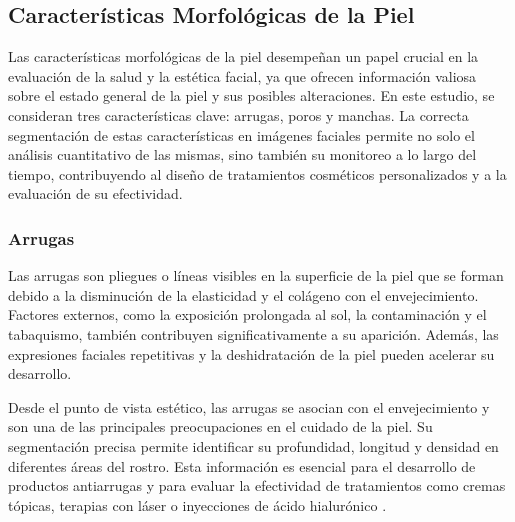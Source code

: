 
\subsection{Características Morfológicas de la Piel}
Las características morfológicas de la piel desempeñan un papel crucial en la evaluación de la salud y la estética facial, ya que ofrecen información valiosa sobre el estado general de la piel y sus posibles alteraciones. En este estudio, se consideran tres características clave: arrugas, poros y manchas. La correcta segmentación de estas características en imágenes faciales permite no solo el análisis cuantitativo de las mismas, sino también su monitoreo a lo largo del tiempo, contribuyendo al diseño de tratamientos cosméticos personalizados y a la evaluación de su efectividad.

\subsubsection{Arrugas}
Las arrugas son pliegues o líneas visibles en la superficie de la piel que se forman debido a la disminución de la elasticidad y el colágeno con el envejecimiento. Factores externos, como la exposición prolongada al sol, la contaminación y el tabaquismo, también contribuyen significativamente a su aparición. Además, las expresiones faciales repetitivas y la deshidratación de la piel pueden acelerar su desarrollo.

Desde el punto de vista estético, las arrugas se asocian con el envejecimiento y son una de las principales preocupaciones en el cuidado de la piel. Su segmentación precisa permite identificar su profundidad, longitud y densidad en diferentes áreas del rostro. Esta información es esencial para el desarrollo de productos antiarrugas y para evaluar la efectividad de tratamientos como cremas tópicas, terapias con láser o inyecciones de ácido hialurónico \cite{autor2021arrugas}.

